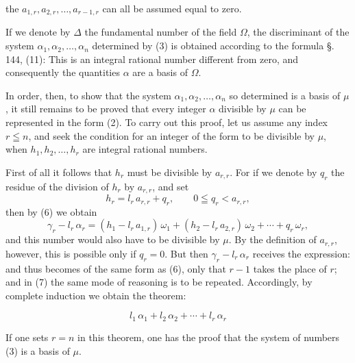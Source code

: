 
the $a_{1,r}, a_{2,r}, \ldots, a_{r-1,r}$ can all be assumed equal to
zero.

If we denote by $\Delta$ the fundamental number of the field $\Omega$,
the discriminant of the system $\alpha_1, \alpha_2, \ldots, \alpha_n$
determined by (3) is obtained according to the formula \S.\,144, (11):
This is an integral rational number different from zero, and
consequently the quantities $\alpha$ are a basis of $\Omega$.

In order, then, to show that the system $\alpha_1, \alpha_2, \ldots,
\alpha_n$ so determined is a basis of $\mu$, it still remains to be
proved that every integer $\alpha$ divisible by $\mu$ can be
represented in the form (2). To carry out this proof, let us assume
any index $r \leqq n$, and seek the condition for an integer of the
form
to be divisible by $\mu$, when $h_1, h_2, \ldots, h_r$ are integral
rational numbers.

First of all it follows that $h_r$ must be divisible by $a_{r,r}$.
For if we denote by $q_r$ the residue of the division of $h_r$ by
$a_{r,r}$, and set
\[
h_r = l_r\,a_{r,r} + q_r, \qquad 0 \leqq q_r < a_{r,r},
\]
then by (6) we obtain
\[
\gamma_r - l_r\,\alpha_r = (h_1 - l_r\,a_{1,r})\,\omega_1 +
(h_2 - l_r\,a_{2,r})\,\omega_2 + \cdots + q_r\,\omega_r,
\]
and this number would also have to be divisible by $\mu$. By the
definition of $a_{r,r}$, however, this is possible only if $q_r = 0$.
But then $\gamma_r - l_r\,\alpha_r$ receives the expression:
and thus becomes of the same form as (6), only that $r - 1$ takes the
place of $r$; and in (7) the same mode of reasoning is to be repeated.
Accordingly, by complete induction we obtain the theorem:

\[
l_1\,\alpha_1 + l_2\,\alpha_2 + \cdots + l_r\,\alpha_r
\]

If one sets $r = n$ in this theorem, one has the proof that the
system of numbers (3) is a basis of $\mu$.
